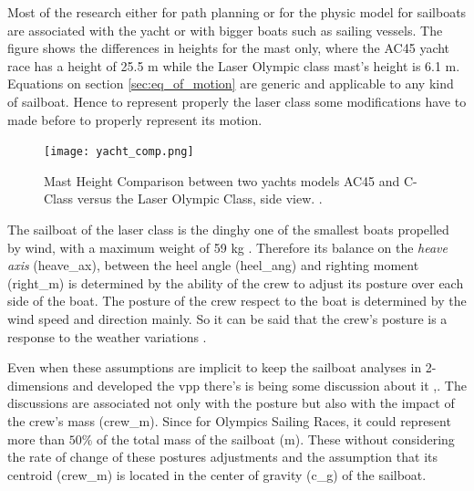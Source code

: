 Most of the research either for path planning or for the physic model for sailboats are associated with the yacht or with bigger boats such as sailing vessels. The figure shows the differences in heights for the mast only, where the AC45 yacht race has a height of 25.5 m while the Laser Olympic class mast's height is 6.1 m. Equations on section  \ref{sec:eq_of_motion} are generic and applicable to any kind of sailboat. Hence to represent properly the laser class some modifications have to made before to properly represent its motion.\par 
\begin{figure} [hbt!]
    \centering
    \texttt{[image: yacht\_comp.png]}
    \caption{Mast Height Comparison between two yachts models AC45 and C-Class versus the Laser Olympic Class, side view. \cite{yacht_compw}.}
    \label{fig:yacht_mast_height}
\end{figure}
The sailboat of the laser class is the dinghy one of the smallest boats propelled by wind, with a maximum weight of 59 kg \cite{sailoly}. Therefore its balance on the \textit{heave axis} (\acrshort{heave_ax}), between the heel angle (\acrshort{heel_ang}) and righting moment (\acrshort{right_m}) is determined by the ability of the crew to adjust its posture over each side of the boat. The posture of the crew respect to the boat is determined by the wind speed and direction mainly. So it can be said that the crew's posture is a response to the weather variations \cite{marchajaereo1979}.\par 

Even when these assumptions are implicit to keep the sailboat analyses in 2-dimensions and developed the \acrshort{vpp} there's is being some discussion about it \cite{philpott1993yacht},\cite{larsonprinciples}. The discussions are associated not only with the posture but also with the impact of the crew's mass (\acrshort{crew_m}). Since for Olympics Sailing Races, it could represent more than $50 \% $ of the total mass of the sailboat (\acrshort{m})\cite{day2017performance}. These without considering the rate of change of these postures adjustments and the assumption that its centroid (\acrshort{crew_m}) is located in the center of gravity (\acrshort{c_g}) of the sailboat. \par 

